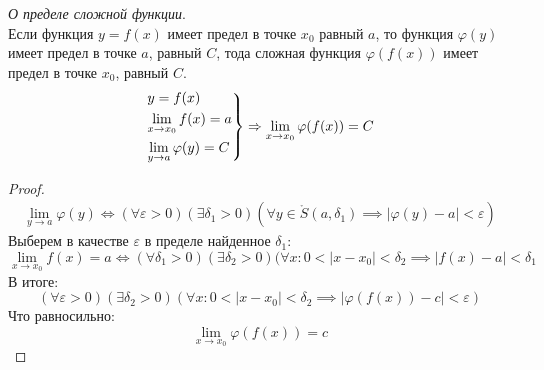 \begin{theorem}
  \textit{О пределе сложной функции}. \\
  Если функция $y = f(x)$ имеет предел в точке  $x_0$ равный $a$, то функция  $\varphi(y)$ имеет предел в точке $a$, равный $C$, тода сложная функция  $\varphi(f(x))$ имеет предел в точке $x_0$, равный $C$.
  \begin{gather*}
    \begin{rcases}
      y = f(x) \\
      \lim_{x \to x_0} f(x) = a \\
      \lim_{y \to a} \varphi(y) = C \\
    \end{rcases}
    \implies \lim_{x \to x_0} \varphi(f(x)) = C
  \end{gather*}
\end{theorem}
\begin{proof}
  \begin{gather*}
    \lim_{y \to a} \varphi(y) \iff (\forall \varepsilon > 0)(\exists \delta_1 > 0)(\forall y \in \mathring{S}(a, \delta_1) \implies |\varphi(y) - a| < \varepsilon) \tag{1}
  \end{gather*}
  Выберем в качестве $\varepsilon$ в пределе найденное $\delta_1$: \[
    \lim_{x \to x_0} f(x) = a \iff (\forall \delta_1 > 0)(\exists \delta_2 > 0)(\forall x: 0 < |x - x_0| < \delta_2 \implies |f(x) - a| < \delta_1 \tag{2} 
  \] 
  В итоге: \[
  (\forall \varepsilon > 0)(\exists \delta_2 > 0)(\forall x: 0 < |x - x_0| < \delta_2 \implies |\varphi(f(x)) - c| < \varepsilon)
  \] 
  Что равносильно: \[
  \lim_{x \to x_0} \varphi(f(x)) = c
  \] 
\end{proof}

